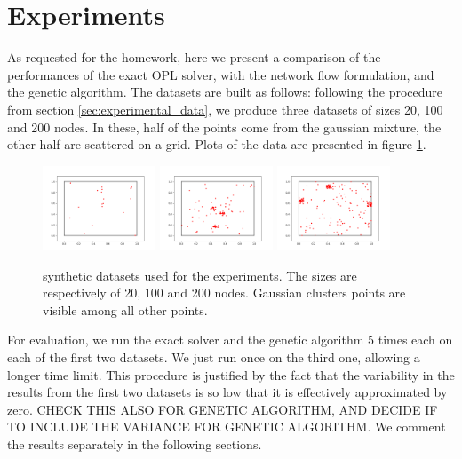 \documentclass{article}
\begin{document}
\section{Experiments}\label{sec:experiments}
As requested for the homework, here we present a comparison of the performances of the exact OPL solver, with the network flow formulation, and the genetic algorithm. The datasets are built as follows: following the procedure from section \ref{sec:experimental_data}, we produce three datasets of sizes 20, 100 and 200 nodes. In these, half of the points come from the gaussian mixture, the other half are scattered on a grid. Plots of the data are presented in figure \ref{fig:datasets}.

\begin{figure}
    \centering
    \includegraphics[width=0.3\textwidth]{pics/experimental_data_20.png}
   \includegraphics[width=0.3\textwidth]{pics/experimental_data_100.png} 
   \includegraphics[width=0.3\textwidth]{pics/experimental_data_200.png}
    \caption{synthetic datasets used for the experiments. The sizes are respectively of 20, 100 and 200 nodes. Gaussian clusters points are visible among all other points.}
    \label{fig:datasets}
\end{figure}

For evaluation, we run the exact solver and the genetic algorithm 5 times each on each of the first two datasets. We just run once on the third one, allowing a longer time limit. This procedure is justified by the fact that the variability in the results from the first two datasets is so low that it is effectively approximated by zero. CHECK THIS ALSO FOR GENETIC ALGORITHM, AND DECIDE IF TO INCLUDE THE VARIANCE FOR GENETIC ALGORITHM. We comment the results separately in the following sections.
\end{document}
